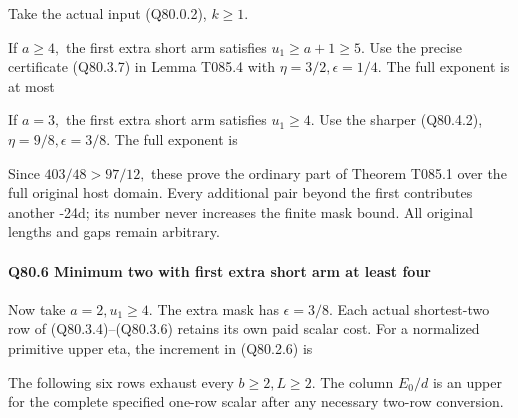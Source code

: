 Take the actual input (Q80.0.2), \(k\ge 1.\)

If \(a\ge 4,\allowbreak \) the first extra short arm satisfies \(u_1\ge a+1\ge 5.\)
Use the precise certificate (Q80.3.7) in Lemma T085.4 with
\(\eta=3/2,\allowbreak  \epsilon=1/4.\) The full exponent is at most


If \(a=3,\allowbreak \) the first extra short arm satisfies \(u_1\ge 4.\)
Use the sharper (Q80.4.2), \(\eta=9/8,\allowbreak  \epsilon=3/8.\) The full exponent is


Since \(403/48>97/12,\allowbreak \) these prove the ordinary part of Theorem T085.1
over the full original host domain. Every additional pair beyond the
first contributes another -24d; its number never increases the finite
mask bound. All original lengths and gaps remain arbitrary.

\paragraph{Q80.6 Minimum two with first extra short arm at least four}

Now take \(a=2,\allowbreak  u_1\ge 4.\) The extra mask has \(\epsilon=3/8.\)
Each actual shortest-two row of (Q80.3.4)--(Q80.3.6) retains its own paid scalar cost.
For a normalized primitive upper eta, the increment in (Q80.2.6) is


The following six rows exhaust every \(b\ge 2,\allowbreak  L\ge 2.\) The column \(E_0/d\)
is an upper for the complete specified one-row scalar after any
necessary two-row conversion.


